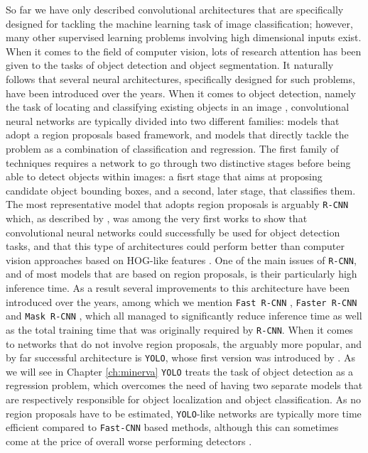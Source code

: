 So far we have only described convolutional architectures that are specifically designed for tackling the machine learning task of image classification; however, many other supervised learning problems involving high dimensional inputs exist. When it comes to the field of computer vision, lots of research attention has been given to the tasks of object detection and object segmentation. It naturally follows that several neural architectures, specifically designed for such problems, have been introduced over the years. When it comes to object detection, namely the task of locating and classifying existing objects in an image \cite{jiao2019survey}, convolutional neural networks are typically divided into two different families: models that adopt a region proposals based framework, and models that directly tackle the problem as a combination of classification and regression. The first family of techniques requires a network to go through two distinctive stages before being able to detect objects within images: a fisrt stage that aims at proposing candidate object bounding boxes, and a second, later stage, that classifies them. The most representative model that adopts region proposals is arguably \texttt{R-CNN} \cite{girshick2014rich} which, as described by \citet{jiao2019survey}, was among the very first works to show that convolutional neural networks could successfully be used for object detection tasks, and that this type of architectures could perform better than computer vision approaches based on HOG-like features \cite{jiao2019survey}. One of the main issues of \texttt{R-CNN}, and of most models that are based on region proposals, is their particularly high inference time. As a result several improvements to this architecture have been introduced over the years, among which we mention \texttt{Fast R-CNN} \cite{ren2015faster}, \texttt{Faster R-CNN} and \texttt{Mask R-CNN} \cite{he2017mask}, which all managed to significantly reduce inference time as well as the total training time that was originally required by \texttt{R-CNN}. When it comes to networks that do not involve region proposals, the arguably more popular, and by far successful architecture is \texttt{YOLO}, whose first version was introduced 
by \citet{redmon2016you}. As we will see in Chapter \ref{ch:minerva} \texttt{YOLO} treats the task of object detection as a regression problem, which overcomes the need of having two separate models that are respectively responsible for object localization and object classification. As no region proposals have to be estimated, \texttt{YOLO}-like networks \cite{redmon2016you,redmon2017yolo9000,huang2018yolo} are typically more time efficient compared to \texttt{Fast-CNN} based methods, although this can sometimes come at the price of overall worse performing detectors \cite{jiao2019survey}.

